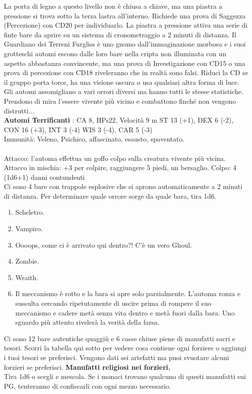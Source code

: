 \documentclass{article}
\begin{document}
    La porta di legno a questo livello non è chiusa a chiave, ma una piastra a pressione si trova sotto la terza lastra all'interno. Richiede una prova di Saggezza (Percezione) con CD20 per individuarlo.
La piastra a pressione attiva una serie di finte bare da aprire su un sistema di cronometraggio a 2 minuti di distanza. Il Guardiano dei Terreni Furgliss è uno gnomo dall'immaginazione morbosa e i suoi grotteschi automi escono dalle loro bare nella cripta non illuminata con un aspetto abbastanza convincente, ma una prova di Investigazione con CD15 o una prova di percezione con CD18 riveleranno che in realtà sono falsi. Riduci la CD se il gruppo porta torce, ha una visione oscura o usa qualsiasi altra forma di luce. Gli automi assomigliano a vari orrori diversi ma hanno tutti le stesse statistiche. Prendono di mira l'essere vivente più vicino e combattono finché non vengono distrutti...\\

    \textbf{Automi Terrificanti} : CA 8, HPs22, Velocità 9 m
    ST 13 (+1), DEX 6 (-2), CON 16 (+3), INT 3 (-4) WIS 3 (-4), CAR 5 (-3)\\
    Immunità: Veleno, Psichico, affascinato, esausto, spaventato.\\
    \\Attacco: l'automa effettua un goffo colpo sulla creatura vivente più vicina. Attacco in mischia: +3 per colpire, raggiungere 5 piedi, un bersaglio. Colpo: 4 (1d6+1) danni contundenti
    \\
    Ci sono 4 bare con trappole esplosive che si aprono automaticamente a 2 minuti di distanza.
    Per determinare quale orrore sorge da quale bara, tira 1d6.
    
\begin{enumerate}
    \item Scheletro.
    \item Vampiro.
    \item Oooops, come ci è arrivato qui dentro?! C’è un vero Ghoul.
    \item Zombie.
    \item Wraith.
    \item Il meccanismo è rotto e la bara si apre solo parzialmente. L'automa ronza e sussulta cercando ripetutamente di uscire prima di rompere il suo meccanismo e cadere metà senza vita dentro e metà fuori dalla bara. Uno sguardo più attento rivelerà la verità della farsa.
\end{enumerate}

Ci sono 12 bare autentiche quaggiù e 6 casse chiuse piene di manufatti sacri e tesori. Scorri la tabella qui sotto per vedere cosa contiene ogni forziere o aggiungi i tuoi tesori se preferisci. Vengono dati sei artefatti ma puoi svuotare alcuni forzieri se preferisci.
\textbf{Manufatti religiosi nei forzieri.}\\
Tira 1d6 o scegli e mescola. Se i monaci trovano qualcuno di questi manufatti sui PG, tenteranno di confiscarli con ogni mezzo necessario.
\end{document}
